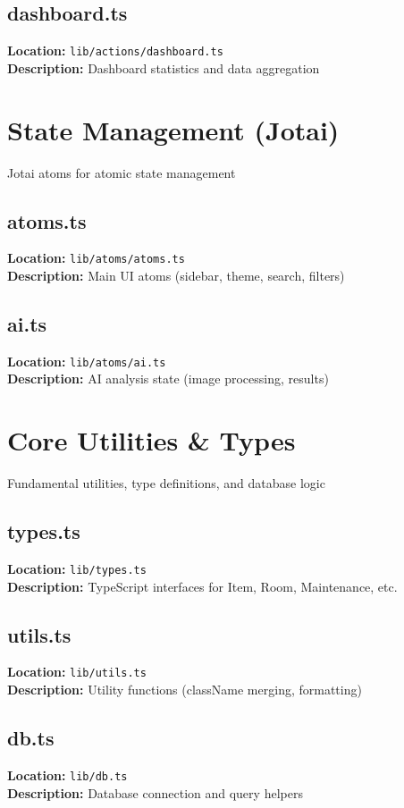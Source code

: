 \documentclass[11pt,twoside,openright]{book}
\newcommand{\filepath}[1]{\texttt{#1}}
\newcommand{\codesection}[3]{
    \section{#1}
    \textbf{Location:} \filepath{#2}\\
    \textbf{Description:} #3\\
}
\begin{document}


\clearpage


\codesection{dashboard.ts}{lib/actions/dashboard.ts}{Dashboard statistics and data aggregation}



\clearpage


\cleardoublepage
\chapter{State Management (Jotai)}

Jotai atoms for atomic state management


\codesection{atoms.ts}{lib/atoms/atoms.ts}{Main UI atoms (sidebar, theme, search, filters)}



\clearpage


\codesection{ai.ts}{lib/atoms/ai.ts}{AI analysis state (image processing, results)}



\clearpage


\cleardoublepage
\chapter{Core Utilities \& Types}

Fundamental utilities, type definitions, and database logic


\codesection{types.ts}{lib/types.ts}{TypeScript interfaces for Item, Room, Maintenance, etc.}



\clearpage


\codesection{utils.ts}{lib/utils.ts}{Utility functions (className merging, formatting)}



\clearpage


\codesection{db.ts}{lib/db.ts}{Database connection and query helpers}



\clearpage
\end{document}
